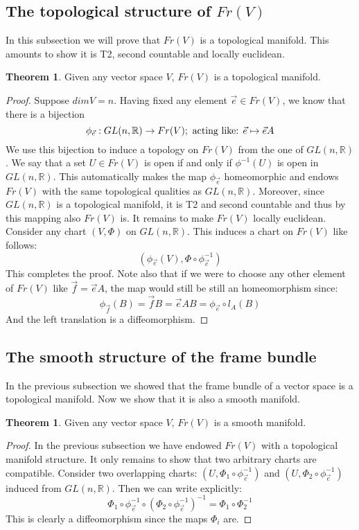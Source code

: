 \documentclass[12pt,a4paper]{report}
\theoremstyle{definition}
\theoremstyle{Theorem}
\newtheorem{Theo}[Def]{Theorem}
\theoremstyle{definition}
\theoremstyle{definition}
\begin{document}
		\subsection{The topological structure of $Fr(V)$}
		In this subsection we will prove that $Fr(V)$ is a topological manifold. This amounts to show it is T2, second countable and locally euclidean.
		\begin{Theo}
			Given any vector space $V$, $Fr(V)$ is a topological manifold.
		\end{Theo}
		\begin{proof}
			Suppose $dim V=n$. Having fixed any element $\vec{e}\in Fr(V)$, we know that there is a bijection 
			$$\phi_{\vec{e}}:GL(n,\mathbb{R})\rightarrow Fr(V); \hbox{ acting like: }\vec{e}\mapsto\vec{e}A$$
			We use this bijection to induce a topology on $Fr(V)$ from the one of $GL(n,\mathbb{R})$. We say that a set $U\in Fr(V)$ is open if and only if $\phi^{-1}(U)$ is open in $GL(n,\mathbb{R})$. This automatically makes the map $\phi_{\vec{e}}$ homeomorphic and endows $Fr(V)$ with the same topological qualities as $GL(n,\mathbb{R})$. Moreover, since $GL(n,\mathbb{R})$ is a topological manifold, it is T2 and second countable and thus by this mapping also $Fr(V)$ is.
			It remains to make $Fr(V)$ locally euclidean. Consider any chart $(V,\Phi)$ on $GL(n,\mathbb{R})$. This induces a chart on $Fr(V)$ like follows:
			$$(\phi_{\vec{e}}(V),\Phi\circ\phi^{-1}_{\vec{e}})$$
			This completes the proof.
			Note also that if we were to choose any other element of $Fr(V)$ like $\vec{f}=\vec{e}A$, the map would still be still an homeomorphism since:
			$$\phi_{\vec{f}}(B)=\vec{f}B=\vec{e}AB=\phi_{\vec{e}}\circ l_A(B)$$
			And the left translation is a diffeomorphism.
		\end{proof}
		\subsection{The smooth structure of the frame bundle}
		In the previous subsection we showed that the frame bundle of a vector space is a topological manifold. Now we show that it is also a smooth manifold. 
		\begin{Theo}
			Given any vector space $V$, $Fr(V)$ is a smooth manifold.
		\end{Theo}
		\begin{proof}
			In the previous subsection we have endowed $Fr(V)$ with a topological manifold structure. It only remains to show that two arbitrary charts are compatible. Consider two overlapping charts: $(U,\Phi_1\circ\phi^{-1}_{\vec{e}})$ and $(U,\Phi_2\circ\phi^{-1}_{\vec{e}})$ induced from $GL(n,\mathbb{R})$. Then we can write explicitly:
			$$\Phi_1\circ\phi^{-1}_{\vec{e}}\circ (\Phi_2\circ\phi^{-1}_{\vec{e}})^{-1}=
			\Phi_1\circ \Phi_2^{-1}$$ 
			This is clearly a diffeomorphism since the maps $\Phi_i$ are.
		\end{proof}
\end{document}
